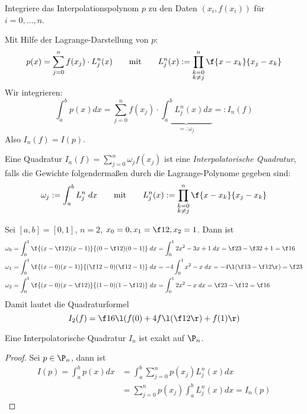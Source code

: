 \documentclass[11pt]{scrartcl}
\begin{document}
Integriere das Interpolationspolynom $p$ zu den Daten $(x_i,f(x_i))$ für $i=0,\dotsc,n$.

Mit Hilfe der Lagrange-Darstellung von $p$:
\[
	p(x) = \sum_{j=0}^n f(x_j) \cdot L_j^n (x) \qquad 
	\text{mit} 
	\qquad L_j^n(x) := \prod_{\substack{k=0\\k\neq j}}^n \f{x-x_k}{x_j-x_k}
\]
Wir integrieren:
\[
	\int_a^b p(x) dx = \sum_{j=0}^n f(x_j) \cdot \underbrace{\int_a^b L_j^n (x) dx}_{=:\omega_j} =: I_n(f)
\]
Also $I_n(f) = I(p)$.

\begin{df}
	\label{2.3}
	Eine Quadratur $I_n(f) = \sum_{j=0}^n \omega_j f(x_j)$ ist eine \emph{Interpolatorische Quadratur}, falls die Gewichte folgendermaßen durch die Lagrange-Polynome gegeben sind:
	\[
		\omega_j := \int_a^b L_j^n \;dx
		\qquad \text{mit} 
		\qquad L_j^n(x) := \prod_{\substack{k=0\\k\neq j}}^n \f{x-x_k}{x_j-x_k}
	\]
\end{df}

\begin{ex*}
	Sei $[a,b] = [0,1]$, $n=2$, $x_0=0, x_1=\f 12, x_2 = 1$.
	Dann ist
	\begin{align*}
		\omega_0 &= \int_0^1 \f {(x-\f 12) (x-1)}{(0-\f 12)(0-1)} \; dx = \int_0^1 2x^2 - 3x+1 \; dx = \f 23 - \f 32 + 1 = \f 16 \\
		\omega_1 &= \int_0^1 \f {(x-0)(x-1)}{(\f 12 - 0)(\f 12 -1)} \; dx = -4 \int_0^1x^2 - x \; dx = -4 \l( \f 13 - \f 12 \r) = \f 23 \\
		\omega_2 &= \int_0^1 \f {(x-0)(x-\f 12)}{(1-0)(1-\f 12)} \; dx = \int_0^1 2x^2 -x \; dx = \f 23 - \f 12 = \f 16
	\end{align*}
	Damit lautet die Quadraturformel
	\[
		I_2(f) = \f 16 \l( f(0) + 4f\l(\f 12\r) + f(1)\r)
	\]
\end{ex*}

\begin{st}
	\label{2.4}
	Eine Interpolatorische Quadratur $I_n$ ist exakt auf $\P_n$.
	\begin{proof}
		Sei $p\in \P_n$, dann ist
		\begin{align*}
			I(p) = \int_a^b p(x) dx &= \int_a^b \sum_{j=0}^n p(x_j) L_j^n(x) dx \\
			&= \sum_{j=0}^n p(x_j) \int_a^b L_j^n(x) dx = I_n(p)
		\end{align*}
	\end{proof}
\end{st}
\end{document}

